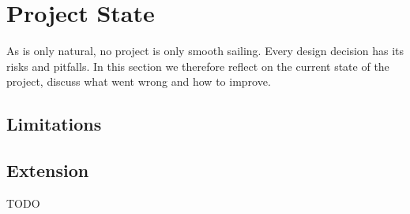 
\section{Project State}
As is only natural, no project is only smooth sailing. Every design decision has its risks and pitfalls. In this section we therefore reflect on the current state of the project, discuss what went wrong and how to improve.
\subsection{Limitations}


\subsection{Extension} %
TODO